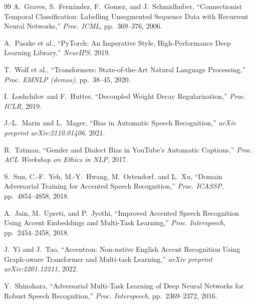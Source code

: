 \documentclass[10pt,twocolumn,letterpaper]{article}
\begin{document}
{\begin{thebibliography}{99}
A.~Graves, S.~Fernández, F.~Gomez, and J.~Schmidhuber,
``Connectionist Temporal Classification: Labelling Unsegmented Sequence Data with Recurrent Neural Networks,''
\textit{Proc. ICML}, pp.~369--376, 2006.

A.~Paszke et al.,
``PyTorch: An Imperative Style, High-Performance Deep Learning Library,''
\textit{NeurIPS}, 2019.

T.~Wolf et al.,
``Transformers: State-of-the-Art Natural Language Processing,''
\textit{Proc. EMNLP (demos)}, pp.~38--45, 2020.

I.~Loshchilov and F.~Hutter,
``Decoupled Weight Decay Regularization,''
\textit{Proc. ICLR}, 2019.

J.-L.~Marin and L.~Mager,
``Bias in Automatic Speech Recognition,''
\textit{arXiv preprint arXiv:2110.01406}, 2021.

R.~Tatman,
``Gender and Dialect Bias in YouTube's Automatic Captions,''
\textit{Proc. ACL Workshop on Ethics in NLP}, 2017.

S.~Sun, C.-F.~Yeh, M.-Y.~Hwang, M.~Ostendorf, and L.~Xu,
``Domain Adversarial Training for Accented Speech Recognition,''
\textit{Proc. ICASSP}, pp.~4854--4858, 2018.

A.~Jain, M.~Upreti, and P.~Jyothi,
``Improved Accented Speech Recognition Using Accent Embeddings and Multi-Task Learning,''
\textit{Proc. Interspeech}, pp.~2454--2458, 2018.

J.~Yi and J.~Tao,
``Accentron: Non-native English Accent Recognition Using Graph-aware Transformer and Multi-task Learning,''
\textit{arXiv preprint arXiv:2201.12211}, 2022.

Y.~Shinohara,
``Adversarial Multi-Task Learning of Deep Neural Networks for Robust Speech Recognition,''
\textit{Proc. Interspeech}, pp.~2369--2372, 2016.

\end{thebibliography}
}
\end{document}

